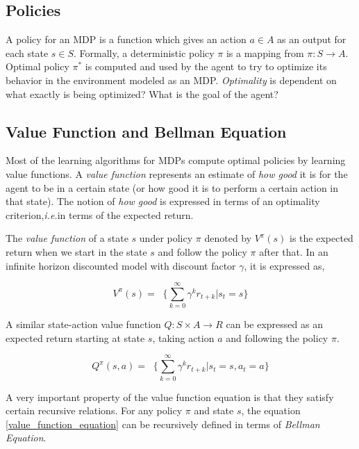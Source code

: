 \documentclass[12pt]{report}
\newcommand{\ie}{\textit{i.e.}}
\begin{document}
\subsection{Policies}
\label{policies}
A policy for an MDP is a function which gives an action $a \in A$ as an output for each state $s \in S$. Formally, a deterministic policy $\pi$ is a mapping from $\pi: S \rightarrow A$. Optimal policy $\pi^*$ is computed and used by the agent to try to optimize its behavior in the environment modeled as an MDP. \textit{Optimality} is dependent on what exactly is being optimized? What is the goal of the agent?

\subsection{Value Function and Bellman Equation}
Most of the learning algorithms for MDPs compute optimal policies by learning value functions. A \textit{value function} represents an estimate of \textit{how good} it is for the agent to be in a certain state (or how good it is to perform a certain action in that state). The notion of \textit{how good} is expressed in
terms of an optimality criterion,\ie in terms of the expected return.\par 
The \textit{value function} of a state $s$ under policy $\pi$ denoted by $V^\pi(s)$ is the expected return when we start in the state $s$ and follow the policy $\pi$ after that. In an infinite horizon discounted model with discount factor $\gamma$, it is expressed as, 

\begin{equation}
\label{value_function_equation}
V^\pi(s) =  \mathop{\mathbb{E_\pi}}\bigg\{\sum_{k=0}^{\infty} \gamma^k r_{t+k}|s_t = s\bigg\} 
\end{equation}

A similar state-action value function $Q : S \times A \rightarrow R$ can be expressed as an expected return starting at state $s$, taking action $a$ and following the policy $\pi$.

\begin{equation}
\label{value_function_state_action_equation}
Q^\pi(s,a) =  \mathop{\mathbb{E_\pi}}\bigg\{\sum_{k=0}^{\infty} \gamma^k r_{t+k}|s_t = s, a_t = a \bigg\} 
\end{equation}

A very important property of the value function equation is that they satisfy certain recursive relations. For any policy $\pi$ and state $s$, the equation \ref{value_function_equation} can be recursively defined in terms of \textit{Bellman Equation}\cite{Bellman:1957}. 
\end{document}
